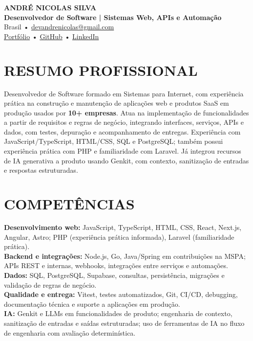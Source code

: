 \documentclass[10pt,a4paper]{article}
\begin{document}
\begin{center}
{\LARGE \textbf{ANDRÉ NICOLAS SILVA}}\\[-1pt]
{\normalsize \textbf{Desenvolvedor de Software | Sistemas Web, APIs e Automação}}\\[2pt]
\small Brasil \quad • \quad \href{mailto:devandrenicolas@gmail.com}{devandrenicolas@gmail.com}\\
\href{https://portfolio-andrenicolas.vercel.app}{Portfólio} \quad • \quad
\href{https://github.com/devAndreNicolas}{GitHub} \quad • \quad
\href{https://www.linkedin.com/in/devandrenicolas}{LinkedIn}
\end{center}
\section*{RESUMO PROFISSIONAL}
Desenvolvedor de Software formado em Sistemas para Internet, com experiência prática na construção e manutenção de aplicações web e produtos SaaS em produção usados por \textbf{10+ empresas}. Atua na implementação de funcionalidades a partir de requisitos e regras de negócio, integrando interfaces, serviços, APIs e dados, com testes, depuração e acompanhamento de entregas. Experiência com JavaScript/TypeScript, HTML/CSS, SQL e PostgreSQL; também possui experiência prática com PHP e familiaridade com Laravel. Já integrou recursos de IA generativa a produto usando Genkit, com contexto, sanitização de entradas e respostas estruturadas.
\section*{COMPETÊNCIAS}
\textbf{Desenvolvimento web:} JavaScript, TypeScript, HTML, CSS, React, Next.js, Angular, Astro; PHP (experiência prática informada), Laravel (familiaridade prática).\\
\textbf{Backend e integrações:} Node.js, Go, Java/Spring em contribuições na MSPA; APIs REST e internas, webhooks, integrações entre serviços e automações.\\
\textbf{Dados:} SQL, PostgreSQL, Supabase, consultas, persistência, migrações e validação de regras de negócio.\\
\textbf{Qualidade e entrega:} Vitest, testes automatizados, Git, CI/CD, debugging, documentação técnica e suporte a aplicações em produção.\\
\textbf{IA:} Genkit e LLMs em funcionalidades de produto; engenharia de contexto, sanitização de entradas e saídas estruturadas; uso de ferramentas de IA no fluxo de engenharia com avaliação determinística.
\end{document}
